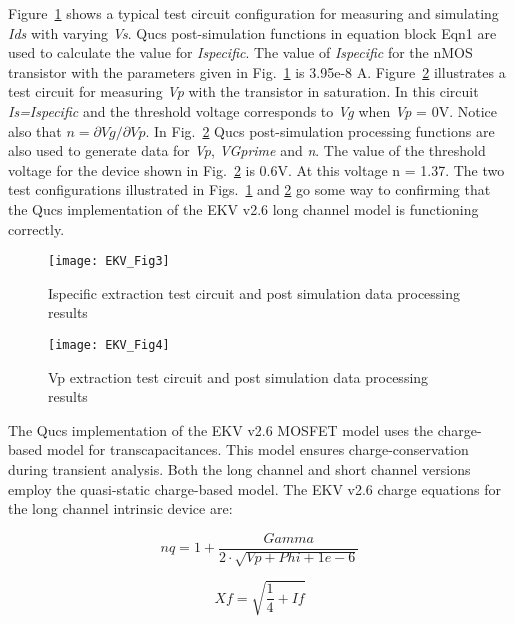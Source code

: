 Figure~\ref{fig:EKV3} shows a typical test circuit configuration for
measuring and simulating \textit{Ids} with varying \textit{Vs}. Qucs
post-simulation functions in equation block Eqn1 are used to calculate
the value for \textit{Ispecific}. The value of \textit{Ispecific} for
the nMOS transistor with the parameters given in Fig.~\ref{fig:EKV3}
is 3.95e-8 A. Figure~\ref{fig:EKV4} illustrates a test circuit for
measuring \textit{Vp} with the transistor in saturation. In this
circuit \textit{Is=Ispecific} and the threshold voltage corresponds to
\textit{Vg} when\textit{ Vp} = 0V.  Notice also that $n=\partial Vg/\partial
Vp$. In Fig.~\ref{fig:EKV4} Qucs post-simulation processing functions 
are also used to generate data for \textit{Vp},
\textit{VGprime} and \textit{n}. The value of the threshold voltage
for the device shown in Fig.~\ref{fig:EKV4} is 0.6V. At this voltage n
= 1.37. The two test configurations illustrated in
Figs.~\ref{fig:EKV3} and \ref{fig:EKV4} go some way to confirming that
the Qucs implementation of the EKV v2.6 long channel model is
functioning correctly.


\begin{figure} 
  \centering
  \texttt{[image: EKV\_Fig3]}
  \caption{Ispecific extraction test circuit and post simulation data processing results}
  \label{fig:EKV3}
\end{figure} 
\begin{figure}
  \centering
  \texttt{[image: EKV\_Fig4]}
  \caption{Vp extraction test circuit and post simulation data processing results}
  \label{fig:EKV4}
\end{figure} 


The Qucs implementation of the EKV v2.6 MOSFET model uses the
charge-based model for transcapacitances. This model ensures
charge-conservation during transient analysis. Both the long channel
and short channel versions employ the quasi-static charge-based
model. The EKV v2.6 charge equations for the long channel intrinsic
device are:

\hspace{20mm}     \begin{equation}
			nq = 1+\dfrac{Gamma}{2 \cdot \sqrt{Vp+Phi+1e-6}}
                  \end{equation}  

\hspace{20mm}     \begin{equation}
			Xf = \sqrt{\dfrac{1}{4} + If}
                  \end{equation}  

